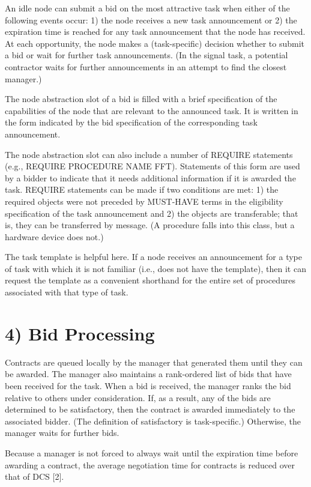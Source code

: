 \documentclass[
]{article}
\begin{document}
An idle node can submit a bid on the most attractive task when either of
the following events occur: 1) the node receives a new task announcement
or 2) the expiration time is reached for any task announcement that the
node has received. At each opportunity, the node makes a (task-specific)
decision whether to submit a bid or wait for further task announcements.
(In the signal task, a potential contractor waits for further
announcements in an attempt to find the closest manager.)

The node abstraction slot of a bid is filled with a brief specification
of the capabilities of the node that are relevant to the announced task.
It is written in the form indicated by the bid specification of the
corresponding task announcement.

The node abstraction slot can also include a number of REQUIRE
statements (e.g., REQUIRE PROCEDURE NAME FFT). Statements of this form
are used by a bidder to indicate that it needs additional information if
it is awarded the task. REQUIRE statements can be made if two conditions
are met: 1) the required objects were not preceded by MUST-HAVE terms in
the eligibility specification of the task announcement and 2) the
objects are transferable; that is, they can be transferred by message.
(A procedure falls into this class, but a hardware device does not.)

The task template is helpful here. If a node receives an announcement
for a type of task with which it is not familiar (i.e., does not have
the template), then it can request the template as a convenient
shorthand for the entire set of procedures associated with that type of
task.

\section{4) Bid Processing}\label{bid-processing}

Contracts are queued locally by the manager that generated them until
they can be awarded. The manager also maintains a rank-ordered list of
bids that have been received for the task. When a bid is received, the
manager ranks the bid relative to others under consideration. If, as a
result, any of the bids are determined to be satisfactory, then the
contract is awarded immediately to the associated bidder. (The
definition of satisfactory is task-specific.) Otherwise, the manager
waits for further bids.

Because a manager is not forced to always wait until the expiration time
before awarding a contract, the average negotiation time for contracts
is reduced over that of DCS {[}2{]}.
\end{document}
